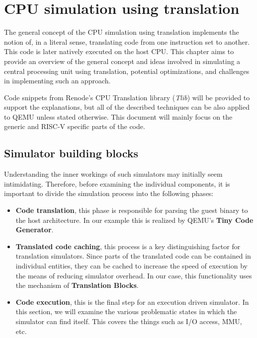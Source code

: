 
\chapter{CPU simulation using translation}

The general concept of the CPU simulation using translation implements the notion of, in a literal sense, translating
code from one instruction set to another. This code is later natively executed on the host CPU. This chapter aims to
provide an overview of the general concept and ideas involved in simulating a central processing unit using translation,
potential optimizations, and challenges in implementing such an approach.

Code snippets from Renode's CPU Translation library (\textit{Tlib})  will be provided to support the explanations, but
all of the described techniques can be also applied to QEMU unless stated otherwise. This document will mainly focus on
the generic and RISC-V specific parts of the code.

\section*{Simulator building blocks}

Understanding the inner workings of such simulators may initially seem intimidating. Therefore, before examining the
individual components, it is important to divide the simulation process into the following phases:

\begin{itemize}
    \item{\textbf{Code translation}, this phase is responsible for parsing the guest binary to the host architecture.
    In our example this is realized 
    by QEMU's \textbf{Tiny Code Generator}.}
    \item{\textbf{Translated code caching}, this process is a key distinguishing factor for translation simulators.
    Since parts of the translated code can be 
    contained in individual entities,
    they can be cached to increase the speed
    of execution by the means of reducing simulator overhead. In our case, this functionality uses the mechanism of
    \textbf{Translation Blocks}.}
    \item{\textbf{Code execution}, this is the final step for an execution driven simulator. In this section, we will
    examine the various problematic states in which the simulator can find itself. This covers the things such as
    I/O access, MMU, etc.}
\end{itemize}

